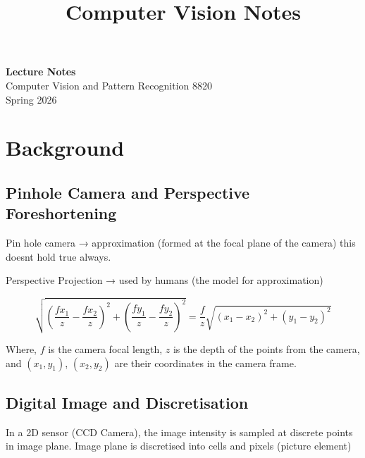 \documentclass[11pt]{article}
\theoremstyle{definition}
\newtheorem{note}{Note}  %
\begin{document}
\setcounter{section}{0}
\title{Computer Vision Notes}



\begin{center}
    {\LARGE \bf Lecture Notes}\\
    {\large Computer Vision and Pattern Recognition 8820}\\
    Spring 2026
\end{center}
\section{Background}
\subsection{Pinhole Camera and Perspective Foreshortening}
Pin hole camera → approximation (formed at the focal plane of the camera) this doesnt hold true always.

Perspective Projection → used by humans (the model for approximation)
\begin{shaded}
    
\begin{equation}
\sqrt{
\left(\frac{f x_1}{z} - \frac{f x_2}{z}\right)^2
+
\left(\frac{f y_1}{z} - \frac{f y_2}{z}\right)^2
}
=
\frac{f}{z}
\sqrt{(x_1 - x_2)^2 + (y_1 - y_2)^2}
\end{equation}
\end{shaded}

\noindent
Where, \(f\) is the camera focal length,
\(z\) is the depth of the points from the camera,
and \((x_1,y_1)\), \((x_2,y_2)\) are their coordinates in the camera frame.


\subsection{Digital Image and Discretisation}
In a 2D sensor (CCD Camera), the image intensity is sampled at discrete points in image plane.
Image plane is discretised into cells and pixels (picture element)
\end{document}
